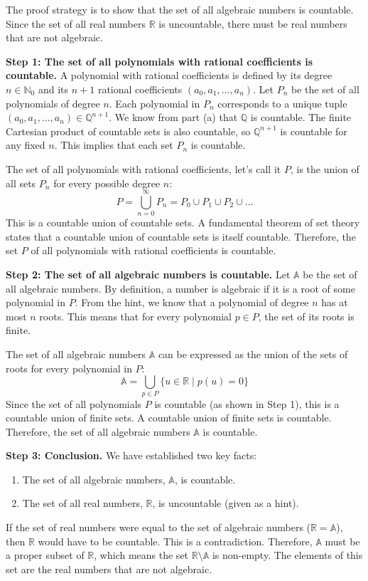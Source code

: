 \documentclass[12pt,a4paper]{article}
\theoremstyle{definition}
\theoremstyle{remark}
\begin{document}
The proof strategy is to show that the set of all algebraic numbers is countable. Since the set of all real numbers $\mathbb{R}$ is uncountable, there must be real numbers that are not algebraic.

\textbf{Step 1: The set of all polynomials with rational coefficients is countable.}
A polynomial with rational coefficients is defined by its degree $n \in \mathbb{N}_0$ and its $n+1$ rational coefficients $(a_0, a_1, \dots, a_n)$.
Let $P_n$ be the set of all polynomials of degree $n$. Each polynomial in $P_n$ corresponds to a unique tuple $(a_0, a_1, \dots, a_n) \in \mathbb{Q}^{n+1}$.
We know from part (a) that $\mathbb{Q}$ is countable. The finite Cartesian product of countable sets is also countable, so $\mathbb{Q}^{n+1}$ is countable for any fixed $n$. This implies that each set $P_n$ is countable.

The set of all polynomials with rational coefficients, let's call it $P$, is the union of all sets $P_n$ for every possible degree $n$:
\[ P = \bigcup_{n=0}^{\infty} P_n = P_0 \cup P_1 \cup P_2 \cup \dots \]
This is a countable union of countable sets. A fundamental theorem of set theory states that a countable union of countable sets is itself countable. Therefore, the set $P$ of all polynomials with rational coefficients is countable.

\textbf{Step 2: The set of all algebraic numbers is countable.}
Let $\mathbb{A}$ be the set of all algebraic numbers. By definition, a number is algebraic if it is a root of some polynomial in $P$.
From the hint, we know that a polynomial of degree $n$ has at most $n$ roots. This means that for every polynomial $p \in P$, the set of its roots is finite.

The set of all algebraic numbers $\mathbb{A}$ can be expressed as the union of the sets of roots for every polynomial in $P$:
\[ \mathbb{A} = \bigcup_{p \in P} \{u \in \mathbb{R} \mid p(u) = 0\} \]
Since the set of all polynomials $P$ is countable (as shown in Step 1), this is a countable union of finite sets. A countable union of finite sets is countable.
Therefore, the set of all algebraic numbers $\mathbb{A}$ is countable.

\textbf{Step 3: Conclusion.}
We have established two key facts:
\begin{enumerate}
    \item The set of all algebraic numbers, $\mathbb{A}$, is countable.
    \item The set of all real numbers, $\mathbb{R}$, is uncountable (given as a hint).
\end{enumerate}
If the set of real numbers were equal to the set of algebraic numbers ($\mathbb{R} = \mathbb{A}$), then $\mathbb{R}$ would have to be countable. This is a contradiction.
Therefore, $\mathbb{A}$ must be a proper subset of $\mathbb{R}$, which means the set $\mathbb{R} \setminus \mathbb{A}$ is non-empty. The elements of this set are the real numbers that are not algebraic.
\end{document}
